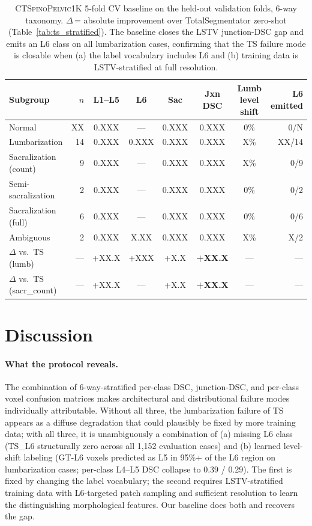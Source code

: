 \documentclass{article}
\newcommand{\dataset}{\textsc{CTSpinoPelvic1K}}
\newcommand{\TS}{TotalSegmentator}
\begin{document}
\begin{table}[t]
\caption{\dataset{} 5-fold CV baseline on the held-out validation
folds, 6-way taxonomy.
$\Delta$\,= absolute improvement over \TS{} zero-shot
(Table~\ref{tab:ts_stratified}).
The baseline closes the LSTV junction-DSC gap and emits an L6
class on all lumbarization cases, confirming that the TS failure
mode is closable when (a) the label vocabulary includes L6 and
(b) training data is LSTV-stratified at full resolution.}
\label{tab:baseline}
\centering
\small
\begin{tabular}{lrcccccr}
\toprule
\bfseries Subgroup & \bfseries $n$ &
\bfseries L1--L5 & \bfseries L6 & \bfseries Sac &
\bfseries Jxn DSC & \bfseries Lumb level shift & \bfseries L6 emitted \\
\midrule
Normal                  & XX & 0.XXX & ---   & 0.XXX & 0.XXX & 0\%   & 0/N \\
Lumbarization           & 14 & 0.XXX & 0.XXX & 0.XXX & 0.XXX & X\%   & XX/14 \\
Sacralization (count)   &  9 & 0.XXX & ---   & 0.XXX & 0.XXX & X\%   & 0/9 \\
Semi-sacralization      &  2 & 0.XXX & ---   & 0.XXX & 0.XXX & 0\%   & 0/2 \\
Sacralization (full)    &  6 & 0.XXX & ---   & 0.XXX & 0.XXX & 0\%   & 0/6 \\
Ambiguous               &  2 & 0.XXX & X.XX  & 0.XXX & 0.XXX & X\%   & X/2 \\
\midrule
$\Delta$ vs.\ TS (lumb)    & --- & +XX.X & +XXX & +X.X & \textbf{+XX.X} & --- & --- \\
$\Delta$ vs.\ TS (sacr\_count) & --- & +XX.X & --- & +X.X & \textbf{+XX.X} & --- & --- \\
\bottomrule
\end{tabular}
\end{table}

\section{Discussion}
\label{sec:discussion}

\paragraph{What the protocol reveals.}
The combination of 6-way-stratified per-class DSC, junction-DSC,
and per-class voxel confusion matrices makes architectural and
distributional failure modes individually attributable.
Without all three, the lumbarization failure of TS appears as a
diffuse degradation that could plausibly be fixed by more training
data; with all three, it is unambiguously a combination of
(a) missing L6 class
(\textsc{TS\_L6} structurally zero across all 1{,}152 evaluation
cases) and (b) learned level-shift labeling
(GT-L6 voxels predicted as L5 in 95\%+ of the L6 region on
lumbarization cases; per-class L4--L5 DSC collapse to 0.39 / 0.29).
The first is fixed by changing the label vocabulary; the second
requires LSTV-stratified training data with L6-targeted patch
sampling and sufficient resolution to learn the distinguishing
morphological features.
Our baseline does both and recovers the gap.
\end{document}
